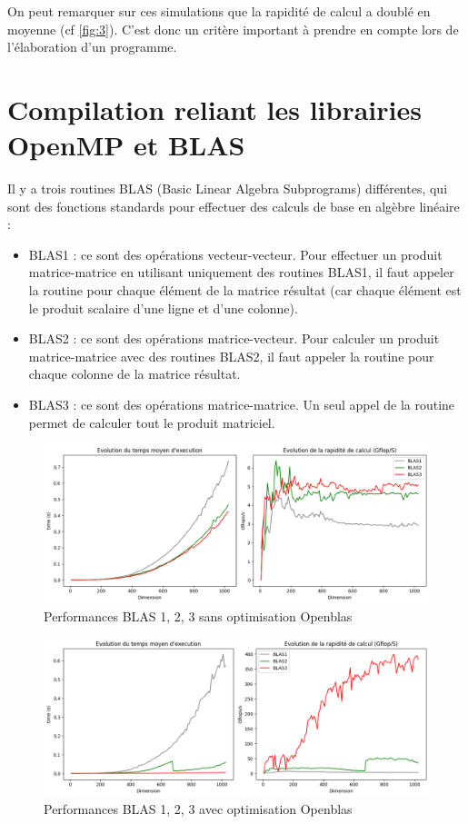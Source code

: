 \documentclass{report}
\begin{document}
On peut remarquer sur ces simulations que la rapidité de calcul a doublé en moyenne (cf \ref{fig:3}). C'est donc un critère important à prendre en compte lors de l'élaboration d'un programme.


\chapter{Compilation reliant les librairies OpenMP et BLAS}

Il y a trois routines BLAS (Basic Linear Algebra Subprograms) différentes, qui sont des fonctions standards pour effectuer des calculs de base en algèbre linéaire :
\begin{itemize}
    \item BLAS1 : ce sont des opérations vecteur-vecteur. Pour effectuer un produit matrice-matrice en utilisant uniquement des routines BLAS1, il faut appeler la routine pour chaque élément de la matrice résultat (car chaque élément est le produit scalaire d'une ligne et d'une colonne).
    \item BLAS2 : ce sont des opérations matrice-vecteur. Pour calculer un produit matrice-matrice avec des routines BLAS2, il faut appeler la routine pour chaque colonne de la matrice résultat.
    \item BLAS3 : ce sont des opérations matrice-matrice. Un seul appel de la routine permet de calculer tout le produit matriciel.
\end{itemize}


\begin{figure}[H]
    \centering
    \includegraphics[width=0.7\linewidth]{images/fig1.png}
    \caption{Performances BLAS 1, 2, 3 sans optimisation Openblas}
    \label{fig:1}
\end{figure}

\begin{figure}[H]
    \centering
    \includegraphics[width=0.7\linewidth]{images/fig2.png}
    \caption{Performances BLAS 1, 2, 3 avec optimisation Openblas}
    \label{fig:2}
\end{figure}
\end{document}
